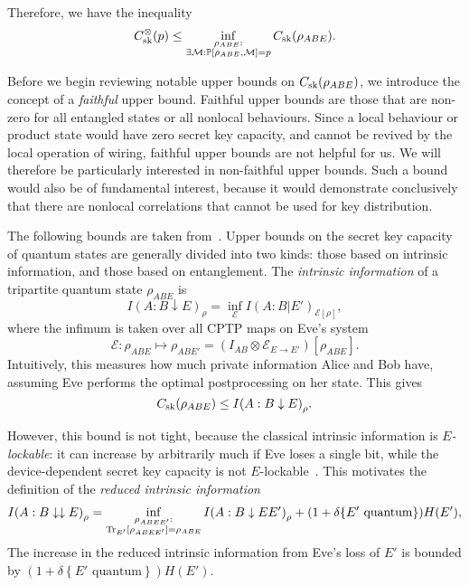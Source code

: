 \documentclass[10pt, a4paper]{article}
\numberwithin{equation}{section} %
\theoremstyle{definition}
\theoremstyle{plain}
\newcommand{\?}{\mathrel{?}} %
\newcommand{\indic}[1]{\delta{\left\{#1\right\}}} %
\newcommand{\Tr}[2][]{\mathop{\mathrm{Tr}#1}\left[ #2 \right]} %
\newcommand{\sM}{\mathcal{M}}
\newcommand{\cE}{\mathcal{E}}
\newcommand{\behav}[2]{\mathbb{P}\left[#1, #2\right]}
\newcommand{\sk}{\rm sk}
\begin{document}
    Therefore, we have the inequality
    \begin{equation}
      C^{\otimes}_{\sk}(p) \leq \inf_{ 
        \substack{\rho_{A B E} : \\ 
        \exists \sM : \behav{\rho_{A B E}}{ \sM} = p}
      } C_{\sk}(\rho_{A B E}).
    \end{equation}

    Before we begin reviewing notable upper bounds on \(C_{\sk}(\rho_{A B E})\), we introduce the concept of a \emph{faithful} upper bound. Faithful upper bounds are those that are non-zero for all entangled states or all nonlocal behaviours. Since a local behaviour or product state would have zero secret key capacity, and cannot be revived by the local operation of wiring, faithful upper bounds are not helpful for us. We will therefore be particularly interested in non-faithful upper bounds. Such a bound would also be of fundamental interest, because it would demonstrate conclusively that there are nonlocal correlations that cannot be used for key distribution.

    The following bounds are taken from~\cite{CQKeyDistill}. Upper bounds on the secret key capacity of quantum states are generally divided into two kinds: those based on intrinsic information, and those based on entanglement. The \emph{intrinsic information} of a tripartite quantum state \(\rho_{A B E}\) is
    \begin{equation}
      I{(A : B \downarrow E)}_{\rho} = \inf_{\cE} I{(A : B|E')}_{\cE[\rho]},
    \end{equation}
    where the infimum is taken over all CPTP maps on Eve's system
    \[\cE : \rho_{A B E} \mapsto \rho_{A B E'} = \left(I_{A B} \otimes \cE_{E \to E'}\right)\left[\rho_{A B E}\right]. \] Intuitively, this measures how much private information Alice and Bob have, assuming Eve performs the optimal postprocessing on her state. This gives
    \begin{equation}
      C_{\sk}(\rho_{A B E}) \leq I{(A : B \downarrow E)}_{\rho}.
    \end{equation}

    However, this bound is not tight, because the classical intrinsic information is \emph{\(E\)-lockable}: it can increase by arbitrarily much if Eve loses a single bit, while the device-dependent secret key capacity is not \(E\)-lockable~\cite[Thm 5.1]{CQKeyDistill}. This motivates the definition of the \emph{reduced intrinsic information}
    \begin{equation}\label{eqn:red_intr_info}
      I{(A : B \downarrow\downarrow E)}_{\rho} = \inf_{%
        \substack{\rho_{A B EE'} : \\ 
      \Tr[_{E'}]{\rho_{A B EE'}} = \rho_{A B E}}}
      I{(A : B \downarrow EE')}_{\rho} + (1+\indic{E' \text{ quantum}})H(E'),
    \end{equation}
    The increase in the reduced intrinsic information from Eve's loss of \(E'\) is bounded by \((1+\indic{E' \text{ quantum}})H(E')\).
\end{document}
